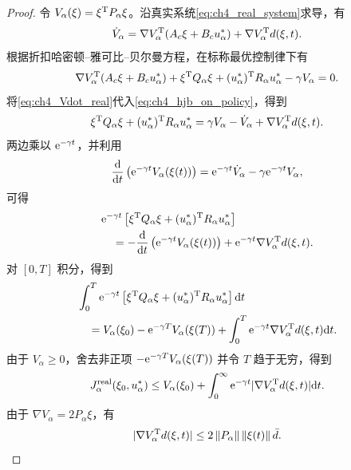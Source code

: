 \begin{proof}
令 $V_\alpha(\xi)=\xi^{\mathrm{T}}P_\alpha\xi$。沿真实系统\eqref{eq:ch4_real_system}求导，有
\begin{equation}
  \dot V_\alpha=\nabla V_\alpha^{\mathrm{T}}(A_c\xi+B_cu_\alpha^*)+\nabla V_\alpha^{\mathrm{T}}d(\xi,t) .
  \label{eq:ch4_Vdot_real}
\end{equation}
根据折扣哈密顿--雅可比--贝尔曼方程，在标称最优控制律下有
\begin{equation}
  \nabla V_\alpha^{\mathrm{T}}(A_c\xi+B_cu_\alpha^*)+\xi^{\mathrm{T}}Q_\alpha\xi+(u_\alpha^*)^{\mathrm{T}}R_\alpha u_\alpha^*-\gamma V_\alpha=0 .
  \label{eq:ch4_hjb_on_policy}
\end{equation}
将\eqref{eq:ch4_Vdot_real}代入\eqref{eq:ch4_hjb_on_policy}，得到
\begin{equation}
  \xi^{\mathrm{T}}Q_\alpha\xi+(u_\alpha^*)^{\mathrm{T}}R_\alpha u_\alpha^*=\gamma V_\alpha-\dot V_\alpha+\nabla V_\alpha^{\mathrm{T}}d(\xi,t) .
  \label{eq:ch4_stage_real}
\end{equation}
两边乘以 $\mathrm{e}^{-\gamma t}$，并利用
\begin{equation}
  \frac{\mathrm{d}}{\mathrm{d} t}\left(\mathrm{e}^{-\gamma t}V_\alpha(\xi(t))\right)=\mathrm{e}^{-\gamma t}\dot V_\alpha-\gamma\mathrm{e}^{-\gamma t}V_\alpha,
\end{equation}
可得
\begin{align}
  &\mathrm{e}^{-\gamma t}\left[\xi^{\mathrm{T}}Q_\alpha\xi+(u_\alpha^*)^{\mathrm{T}}R_\alpha u_\alpha^*\right] \\
  &\quad =-\frac{\mathrm{d}}{\mathrm{d} t}\left(\mathrm{e}^{-\gamma t}V_\alpha(\xi(t))\right)+\mathrm{e}^{-\gamma t}\nabla V_\alpha^{\mathrm{T}}d(\xi,t).
\end{align}
对 $[0,T]$ 积分，得到
\begin{align}
  &\int_0^T\mathrm{e}^{-\gamma t}\left[\xi^{\mathrm{T}}Q_\alpha\xi+(u_\alpha^*)^{\mathrm{T}}R_\alpha u_\alpha^*\right]\mathrm{d} t \\
  &\quad =V_\alpha(\xi_0)-\mathrm{e}^{-\gamma T}V_\alpha(\xi(T))+\int_0^T\mathrm{e}^{-\gamma t}\nabla V_\alpha^{\mathrm{T}}d(\xi,t)\mathrm{d} t .
\end{align}
由于 $V_\alpha\ge0$，舍去非正项 $-\mathrm{e}^{-\gamma T}V_\alpha(\xi(T))$ 并令 $T$ 趋于无穷，得到
\begin{equation}
  J_\alpha^{\mathrm{real}}(\xi_0,u_\alpha^*)\le V_\alpha(\xi_0)+\int_0^\infty\mathrm{e}^{-\gamma t}|\nabla V_\alpha^{\mathrm{T}}d(\xi,t)|\mathrm{d} t .
  \label{eq:ch4_real_cost_prebound}
\end{equation}
由于 $\nabla V_\alpha=2P_\alpha\xi$，有
\begin{equation}
  |\nabla V_\alpha^{\mathrm{T}}d(\xi,t)|\le2\left\lVert P_\alpha\right\rVert\left\lVert \xi(t)\right\rVert\bar d .
\end{equation}

\end{proof}
